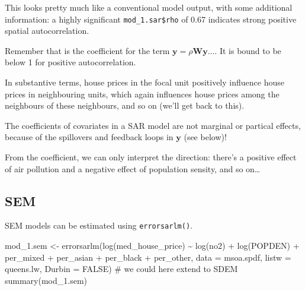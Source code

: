 \documentclass[
  letterpaper,
  DIV=11,
  numbers=noendperiod]{scrreprt}
\newenvironment{Shaded}{\begin{snugshade}}{\end{snugshade}}
\newcommand{\AttributeTok}[1]{\textcolor[rgb]{0.40,0.45,0.13}{#1}}
\newcommand{\CommentTok}[1]{\textcolor[rgb]{0.37,0.37,0.37}{#1}}
\newcommand{\ConstantTok}[1]{\textcolor[rgb]{0.56,0.35,0.01}{#1}}
\newcommand{\FunctionTok}[1]{\textcolor[rgb]{0.28,0.35,0.67}{#1}}
\newcommand{\NormalTok}[1]{\textcolor[rgb]{0.00,0.23,0.31}{#1}}
\newcommand{\OtherTok}[1]{\textcolor[rgb]{0.00,0.23,0.31}{#1}}
\newcommand{\SpecialCharTok}[1]{\textcolor[rgb]{0.37,0.37,0.37}{#1}}
\begin{document}
This looks pretty much like a conventional model output, with some
additional information: a highly significant \texttt{mod\_1.sar\$rho} of
0.67 indicates strong positive spatial autocorrelation.

Remember that is the coefficient for the term
\(\boldsymbol{\mathbf{y}} = \rho \boldsymbol{\mathbf{W}} \boldsymbol{\mathbf{y}} \ldots\).
It is bound to be below 1 for positive autocorrelation.

In substantive terms, house prices in the focal unit positively
influence house prices in neighbouring units, which again influences
house prices among the neighbours of these neighbours, and so on (we'll
get back to this).

\begin{tcolorbox}[enhanced jigsaw, opacitybacktitle=0.6, left=2mm, leftrule=.75mm, toptitle=1mm, breakable, colback=white, bottomrule=.15mm, colframe=quarto-callout-warning-color-frame, colbacktitle=quarto-callout-warning-color!10!white, coltitle=black, bottomtitle=1mm, titlerule=0mm, title=\textcolor{quarto-callout-warning-color}{\faExclamationTriangle}\hspace{0.5em}{Warning}, opacityback=0, arc=.35mm, rightrule=.15mm, toprule=.15mm]

The coefficients of covariates in a SAR model are not marginal or
partical effects, because of the spillovers and feedback loops in
\(\boldsymbol{\mathbf{y}}\) (see below)!

From the coefficient, we can only interpret the direction: there's a
positive effect of air pollution and a negative effect of population
sensity, and so on\ldots{}

\end{tcolorbox}

\hypertarget{sem}{%
\subsection{SEM}\label{sem}}

SEM models can be estimated using \texttt{errorsarlm()}.

\begin{Shaded}
\begin{Highlighting}[]
\NormalTok{mod\_1.sem }\OtherTok{\textless{}{-}} \FunctionTok{errorsarlm}\NormalTok{(}\FunctionTok{log}\NormalTok{(med\_house\_price) }\SpecialCharTok{\textasciitilde{}} \FunctionTok{log}\NormalTok{(no2) }\SpecialCharTok{+} \FunctionTok{log}\NormalTok{(POPDEN) }\SpecialCharTok{+}
\NormalTok{                          per\_mixed }\SpecialCharTok{+}\NormalTok{ per\_asian }\SpecialCharTok{+}\NormalTok{ per\_black }\SpecialCharTok{+}\NormalTok{ per\_other,  }
                        \AttributeTok{data =}\NormalTok{ msoa.spdf, }
                        \AttributeTok{listw =}\NormalTok{ queens.lw,}
                        \AttributeTok{Durbin =} \ConstantTok{FALSE}\NormalTok{) }\CommentTok{\# we could here extend to SDEM}
\FunctionTok{summary}\NormalTok{(mod\_1.sem)}
\end{Highlighting}
\end{Shaded}
\end{document}
